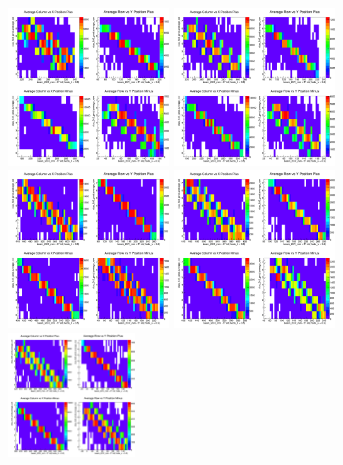 \documentclass[hidelinks,11pt]{article}
\numberwithin{figure}{section}
\numberwithin{table}{section}
\begin{document}
\begin{figure}[hbtp]
\begin{center}
\includegraphics[width=0.38\textwidth]{Plots/Hodo/Hodoscope20172nd.png}
\includegraphics[width=0.38\textwidth]{Plots/Hodo/Hodoscope20173rd.png}
\includegraphics[width=0.38\textwidth]{Plots/Hodo/Hodoscope20183rd.png}
\includegraphics[width=0.38\textwidth]{Plots/Hodo/Hodoscope20184th.png}
\includegraphics[width=0.30\textwidth]{Plots/Hodo/Hodoscope20185th.png}

\end{center}
\end{figure}
\end{document}
